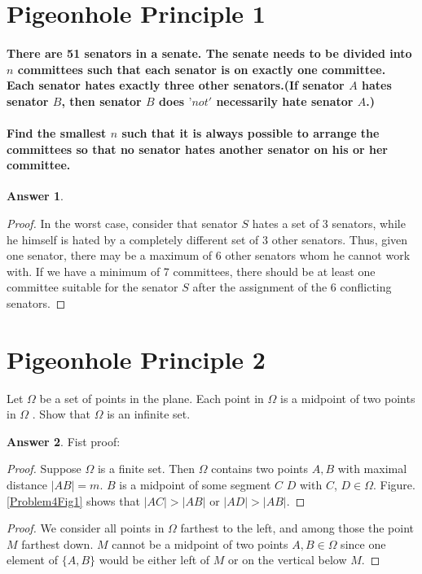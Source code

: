 \documentclass[a4paper]{article}
\renewcommand{\(}{\left(}
\renewcommand{\)}{\right)}
\theoremstyle{plain}
\theoremstyle{plain}
\theoremstyle{definition}
\newtheorem*{answer}{Answer}
\begin{document}
\section{Pigeonhole Principle 1}
\paragraph*{
There are 51 senators in a senate. The senate needs to be divided into $n$ committees such that each senator is on exactly one committee. Each senator hates exactly three other senators.(If senator $A$ hates senator $B$, then senator $B$ does $’not'$ necessarily hate senator $A$.)
}
\paragraph*{
Find the smallest $n$ such that it is always possible to arrange the committees so that no senator hates another senator on his or her committee.
}
\begin{shaded}
\begin{answer}
\begin{proof}
In the worst case, consider that senator $S$ hates a set of 3 senators, while he himself is hated by a completely different set of 3 other senators. Thus, given one senator, there may be a maximum of 6 other senators whom he cannot work with. If we have a minimum of 7 committees, there should be at least one committee suitable for the senator $S$ after the assignment of the 6 conflicting senators.
\end{proof}
\end{answer}
\end{shaded}

\section{Pigeonhole Principle 2}
Let $\Omega$ be a set of points in the plane. Each point in $\Omega$ is a midpoint of two points in $\Omega$ . Show that $\Omega$ is an infinite set.
\begin{shaded}
\begin{answer}

Fist proof:
\begin{proof}
Suppose $\Omega$ is a finite set. Then $\Omega$ contains two points $A, B$ with
maximal distance $|AB|  = m $. $B$ is a midpoint of some segment $C $ $ D $ with $C$, $ D  \in \Omega $.
Figure.
\ref{Problem4Fig1}
 shows that $ |AC| > |AB|$ or $|AD| > |AB|$.
\end{proof}


\begin{proof}
We consider all points in $\Omega$ farthest to the left, and among those
the point $M$ farthest down. $M$ cannot be a midpoint of two points $A,B \in \Omega $ since
one element of $\{A,B\}$ would be either left of $M$ or on the vertical below $M$.
\end{proof}
\end{answer}
\end{shaded}
\end{document}
